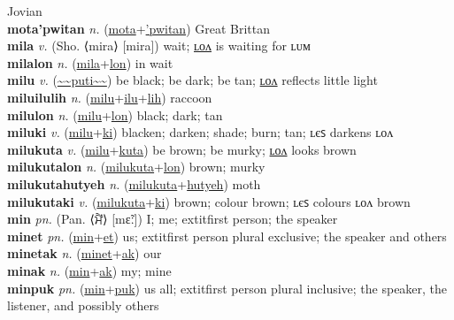 Jovian \label{motapumak} \\
\textbf{mota'pwitan} \textit{n.} (\hyperref[mota]{mota}+\hyperref['pwitan]{'pwitan})
Great Brittan \label{mota'pwitan} \\
\textbf{mila} \textit{v.} (Sho. ⟨mira⟩ [mira])
wait; \hyperref[milalon]{ʟᴏᴧ} is waiting for ʟᴜᴍ \label{mila} \\
\textbf{milalon} \textit{n.} (\hyperref[mila]{mila}+\hyperref[lon]{lon})
in wait \label{milalon} \\
\textbf{milu} \textit{v.} (\hyperref[puti]{\~{}\~{}puti\~{}\~{}})
be black; be dark; be tan; \hyperref[milulon]{ʟᴏᴧ} reflects little light \label{milu} \\
\textbf{miluilulih} \textit{n.} (\hyperref[milu]{milu}+\hyperref[ilu]{ilu}+\hyperref[lih]{lih})
raccoon \label{miluilulih} \\
\textbf{milulon} \textit{n.} (\hyperref[milu]{milu}+\hyperref[lon]{lon})
black; dark; tan \label{milulon} \\
\textbf{miluki} \textit{v.} (\hyperref[milu]{milu}+\hyperref[ki]{ki})
blacken; darken; shade; burn; tan; ʟєꜱ darkens ʟᴏᴧ \label{miluki} \\
\textbf{milukuta} \textit{v.} (\hyperref[milu]{milu}+\hyperref[kuta]{kuta})
be brown; be murky; \hyperref[milukutalon]{ʟᴏᴧ} looks brown \label{milukuta} \\
\textbf{milukutalon} \textit{n.} (\hyperref[milukuta]{milukuta}+\hyperref[lon]{lon})
brown; murky \label{milukutalon} \\
\textbf{milukutahutyeh} \textit{n.} (\hyperref[milukuta]{milukuta}+\hyperref[hutyeh]{hutyeh})
moth \label{milukutahutyeh} \\
\textbf{milukutaki} \textit{v.} (\hyperref[milukuta]{milukuta}+\hyperref[ki]{ki})
brown; colour brown; ʟєꜱ colours ʟᴏᴧ brown \label{milukutaki} \\
\textbf{min} \textit{pn.} (Pan. ⟨ਮੈਂ⟩ [mɛ̃ː])
I; me; 	extit{first person}; the speaker \label{min} \\
\textbf{minet} \textit{pn.} (\hyperref[min]{min}+\hyperref[et]{et})
us; 	extit{first person plural exclusive}; the speaker and others \label{minet} \\
\textbf{minetak} \textit{n.} (\hyperref[minet]{minet}+\hyperref[ak]{ak})
our \label{minetak} \\
\textbf{minak} \textit{n.} (\hyperref[min]{min}+\hyperref[ak]{ak})
my; mine \label{minak} \\
\textbf{minpuk} \textit{pn.} (\hyperref[min]{min}+\hyperref[puk]{puk})
us all; 	extit{first person plural inclusive}; the speaker, the listener, and possibly others \label{minpuk} \\
